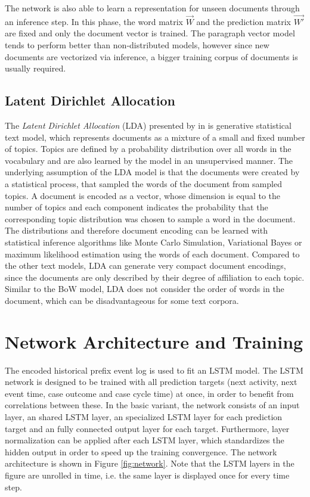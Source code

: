 The network is also able to learn a representation for unseen documents through an inference step.
In this phase, the word matrix $\vec{W}$ and the prediction matrix $\vec{W'}$ are fixed and only the document vector is trained.
The paragraph vector model tends to perform better than non-distributed models, however since new documents are vectorized via inference, a bigger training corpus of documents is usually required.

\subsection{Latent Dirichlet Allocation}\label{sec:lda}

The \textit{Latent Dirichlet Allocation} (LDA) presented by \citeauthor{DBLP:journals/jmlr/BleiNJ03} in \citeyear{DBLP:journals/jmlr/BleiNJ03} \cite{DBLP:journals/jmlr/BleiNJ03} is generative statistical text model, which represents documents as a mixture of a small and fixed number of topics.
Topics are defined by a probability distribution over all words in the vocabulary and are also learned by the model in an unsupervised manner.
The underlying assumption of the LDA model is that the documents were created by a statistical process, that sampled the words of the document from sampled topics.
A document is encoded as a vector, whose dimension is equal to the number of topics and each component indicates the probability that the corresponding topic distribution was chosen to sample a word in the document.
The distributions and therefore document encoding can be learned with statistical inference algorithms like Monte Carlo Simulation, Variational Bayes or maximum likelihood estimation using the words of each document.
Compared to the other text models, LDA can generate very compact document encodings, since the documents are only described by their degree of affiliation to each topic.
Similar to the BoW model, LDA does not consider the order of words in the document, which can be disadvantageous for some text corpora.

\section{Network Architecture and Training}
The encoded historical prefix event log is used to fit an LSTM model.
The LSTM network is designed to be trained with all prediction targets (next activity, next event time, case outcome and case cycle time) at once, in order to benefit from correlations between these.
In the basic variant, the network consists of an input layer, an shared LSTM layer, an specialized LSTM layer for each prediction target and an fully connected output layer for each target.
Furthermore, layer normalization \cite{DBLP:journals/corr/BaKH16} can be applied after each LSTM layer, which standardizes the hidden output in order to speed up the training convergence.
The network architecture is shown in Figure \ref{fig:network}.
Note that the LSTM layers in the figure are unrolled in time, i.e. the same layer is displayed once for every time step.

